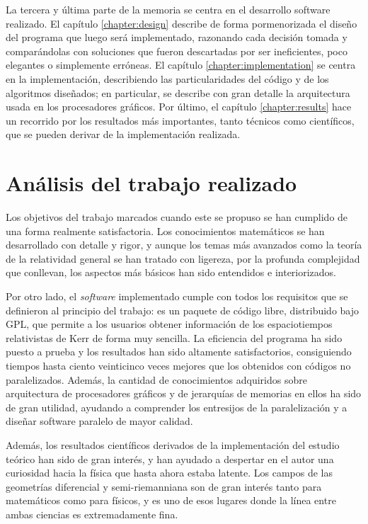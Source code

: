 La tercera y última parte de la memoria se centra en el desarrollo software realizado. El capítulo \ref{chapter:design} describe de forma pormenorizada el diseño del programa que luego será implementado, razonando cada decisión tomada y comparándolas con soluciones que fueron descartadas por ser ineficientes, poco elegantes o simplemente erróneas. El capítulo \ref{chapter:implementation} se centra en la implementación, describiendo las particularidades del código y de los algoritmos diseñados; en particular, se describe con gran detalle la arquitectura usada en los procesadores gráficos. Por último, el capítulo \ref{chapter:results} hace un recorrido por los resultados más importantes, tanto técnicos como científicos, que se pueden derivar de la implementación realizada.

\section*{Análisis del trabajo realizado}

Los objetivos del trabajo marcados cuando este se propuso se han cumplido de una forma realmente satisfactoria. Los conocimientos matemáticos se han desarrollado con detalle y rigor, y aunque los temas más avanzados como la teoría de la relatividad general se han tratado con ligereza, por la profunda complejidad que conllevan, los aspectos más básicos han sido entendidos e interiorizados.

Por otro lado, el \emph{software} implementado cumple con todos los requisitos que se definieron al principio del trabajo: es un paquete de código libre, distribuido bajo \ac{GPL}, que permite a los usuarios obtener información de los espaciotiempos relativistas de Kerr de forma muy sencilla. La eficiencia del programa ha sido puesto a prueba y los resultados han sido altamente satisfactorios, consiguiendo tiempos hasta ciento veinticinco veces mejores que los obtenidos con códigos no paralelizados. Además, la cantidad de conocimientos adquiridos sobre arquitectura de procesadores gráficos y de jerarquías de memorias en ellos ha sido de gran utilidad, ayudando a comprender los entresijos de la paralelización y a diseñar software paralelo de mayor calidad.

Además, los resultados científicos derivados de la implementación del estudio teórico han sido de gran interés, y han ayudado a despertar en el autor una curiosidad hacia la física que hasta ahora estaba latente. Los campos de las geometrías diferencial y semi-riemanniana son de gran interés tanto para matemáticos como para físicos, y es uno de esos lugares donde la línea entre ambas ciencias es extremadamente fina.


